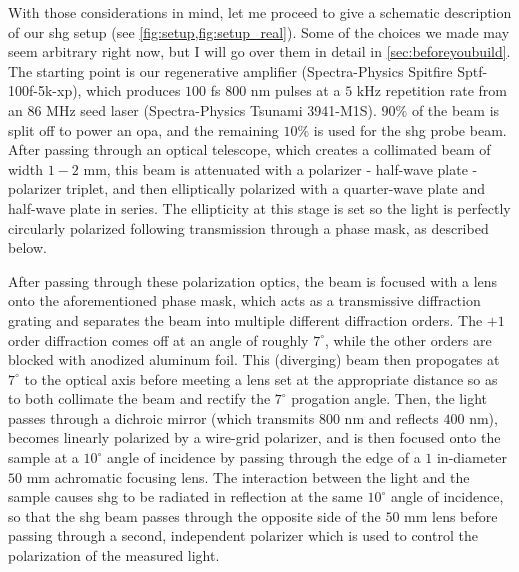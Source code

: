 With those considerations in mind, let me proceed to give a schematic description of our \gls{shg} setup (see \cref{fig:setup,fig:setup_real}).
Some of the choices we made may seem arbitrary right now, but I will go over them in detail in \cref{sec:beforeyoubuild}.
The starting point is our regenerative amplifier (Spectra-Physics Spitfire Sptf-100f-5k-xp), which produces $100$ \si{fs} $800$ \si{nm} pulses at a $5$ \si{kHz} repetition rate from an $86$ \si{MHz} seed laser (Spectra-Physics Tsunami 3941-M1S). 
$90\%$ of the beam is split off to power an \gls{opa}, and the remaining $10\%$ is used for the \gls{shg} probe beam.
After passing through an optical telescope, which creates a collimated beam of width $1-2$ \si{mm}, this beam is attenuated with a polarizer - half-wave plate - polarizer triplet, and then elliptically polarized with a quarter-wave plate and half-wave plate in series.
The ellipticity at this stage is set so the light is perfectly circularly polarized following transmission through a phase mask, as described below.

After passing through these polarization optics, the beam is focused with a lens onto the aforementioned phase mask, which acts as a transmissive diffraction grating and separates the beam into multiple different diffraction orders.
The $+1$ order diffraction comes off at an angle of roughly $7^\circ$, while the other orders are blocked with anodized aluminum foil. 
This (diverging) beam then propogates at $7^\circ$ to the optical axis before meeting a lens set at the appropriate distance so as to both collimate the beam and rectify the $7^\circ$ progation angle.
Then, the light passes through a dichroic mirror (which transmits $800$ \si{nm} and reflects $400$ \si{nm}), becomes linearly polarized by a wire-grid polarizer, and is then focused onto the sample at a $10^\circ$ angle of incidence by passing through the edge of a $1$ \si{in}-diameter $50$ \si{mm} achromatic focusing lens.
The interaction between the light and the sample causes \gls{shg} to be radiated in reflection at the same $10^\circ$ angle of incidence, so that the \gls{shg} beam passes through the opposite side of the $50$ \si{mm} lens before passing through a second, independent polarizer which is used to control the polarization of the measured light.

